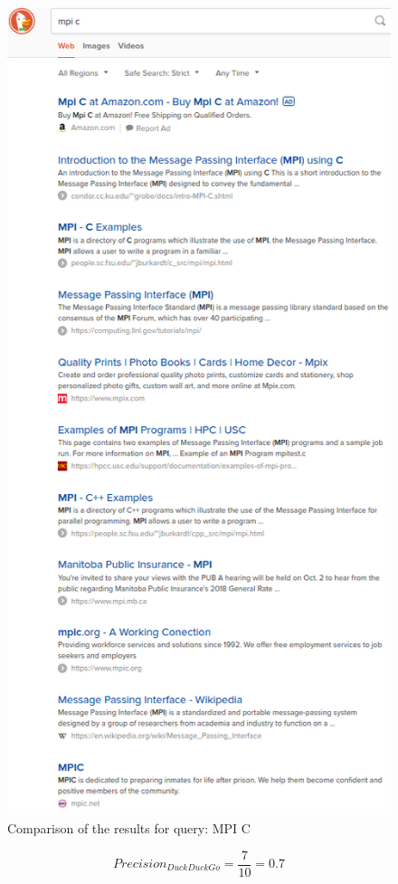 \documentclass{article}
\begin{document}
\begin{figure}
	\includegraphics[scale=0.5]{ddg_mpi_c.png}
	\caption{Comparison of the results for query: MPI C}
	\label{fig:mpi_c}
\end{figure}
$$Precision_{DuckDuckGo}=\frac{7}{10}=0.7$$
\end{document}

